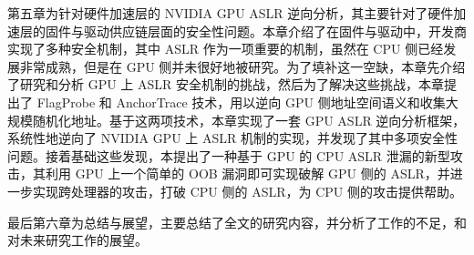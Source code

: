 第五章为针对硬件加速层的 NVIDIA GPU ASLR 逆向分析，其主要针对了硬件加速层的固件与驱动供应链层面的安全性问题。本章介绍了在固件与驱动中，开发商实现了多种安全机制，其中 ASLR 作为一项重要的机制，虽然在 CPU 侧已经发展非常成熟，但是在 GPU 侧并未很好地被研究。为了填补这一空缺，本章先介绍了研究和分析 GPU 上 ASLR 安全机制的挑战，然后为了解决这些挑战，本章提出了 FlagProbe 和 AnchorTrace 技术，用以逆向 GPU 侧地址空间语义和收集大规模随机化地址。基于这两项技术，本章实现了一套 GPU ASLR 逆向分析框架，系统性地逆向了 NVIDIA GPU 上 ASLR 机制的实现，并发现了其中多项安全性问题。接着基础这些发现，本提出了一种基于 GPU 的 CPU ASLR 泄漏的新型攻击，其利用 GPU 上一个简单的 OOB 漏洞即可实现破解 GPU 侧的 ASLR，并进一步实现跨处理器的攻击，打破 CPU 侧的 ASLR，为 CPU 侧的攻击提供帮助。

最后第六章为总结与展望，主要总结了全文的研究内容，并分析了工作的不足，和对未来研究工作的展望。










